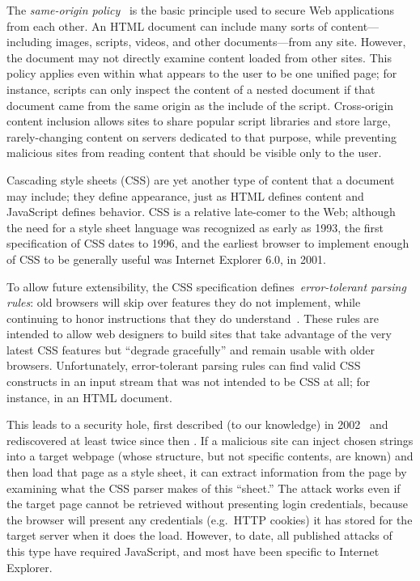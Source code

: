 \documentclass{sig-alternate}
\begin{document}
The \emph{same-origin policy}~\cite{mozillasameorigin} is the basic principle
used to secure Web applications from each other. An HTML document can include
many sorts of content---including images, scripts, videos, and other
documents---from any site. However, the document may not directly examine
content loaded from other sites. This policy applies even within what appears
to the user to be one unified page; for instance, scripts can only inspect the
content of a nested document if that document came from the same origin
as the include of the script. Cross-origin content inclusion allows sites to
share popular script libraries and store large, rarely-changing content on
servers dedicated to that purpose, while preventing malicious sites from
reading content  that should be visible only to the user.

Cascading style sheets (CSS) are yet another type of content that a
document may include; they define appearance, just as HTML defines
content and JavaScript defines behavior. CSS is a relative late-comer
to the Web; although the need for a style sheet language was
recognized as early as 1993, the first specification of CSS dates to
1996, and the earliest browser to implement enough of CSS to be
generally useful was Internet Explorer 6.0, in 2001.~\cite{css-hakon}

To allow future extensibility, the CSS specification
defines~\emph{error-tolerant parsing rules}: old browsers will skip
over features they do not implement, while continuing to honor
instructions that they do understand~\cite{syndata}. These rules are
intended to allow web designers to build sites that take advantage of
the very latest CSS features but ``degrade gracefully'' and remain
usable with older browsers. Unfortunately, error-tolerant parsing
rules can find valid CSS constructs in an input stream that was not
intended to be CSS at all; for instance, in an HTML document.

This leads to a security hole, first described (to our knowledge) in
2002~\cite{cssxss02} and rediscovered at least twice since then
\cite{cssxss05,cssxss08}.  If a malicious site can inject chosen
strings into a target webpage (whose structure, but not specific
contents, are known) and then load that page as a style sheet, it can
extract information from the page by examining what the CSS parser
makes of this ``sheet.'' The attack works even if the target page
cannot be retrieved without presenting login credentials, because the
browser will present any credentials (e.g.~HTTP cookies) it has stored
for the target server when it does the load.  However, to date, all
published attacks of this type have required JavaScript, and most have
been specific to Internet Explorer.
\end{document}
